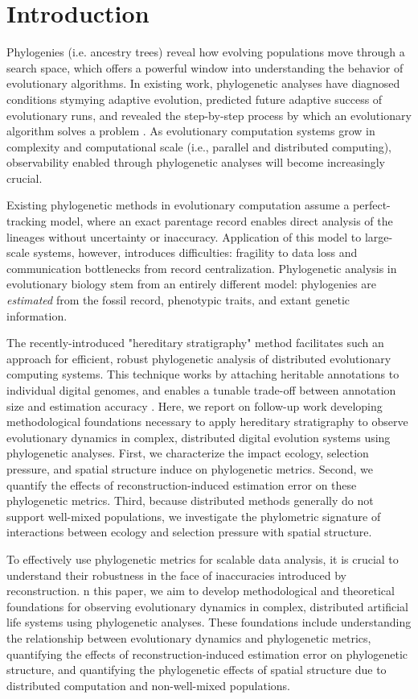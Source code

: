 \section{Introduction}

Phylogenies (i.e. ancestry trees) reveal how evolving populations move through a search space, which offers a powerful window into understanding the behavior of evolutionary algorithms.
In existing work, phylogenetic analyses have diagnosed conditions stymying adaptive evolution, predicted future adaptive success of evolutionary runs, and revealed the step-by-step process by which an evolutionary algorithm solves a problem \citep{hernandezWhatCanPhylogenetic2022a,shahbandeganUntanglingPhylogeneticDiversity2022a,lalejiniEvolutionaryOriginsPhenotypic2016}.
As evolutionary computation systems grow in complexity and computational scale  (i.e., parallel and distributed computing), observability enabled through phylogenetic analyses will become increasingly crucial.

Existing phylogenetic methods in evolutionary computation assume a perfect-tracking model, where an exact parentage record enables direct analysis of the lineages without uncertainty or inaccuracy.
Application of this model to large-scale systems, however, introduces difficulties: fragility to data loss and communication bottlenecks from record centralization.
Phylogenetic analysis in evolutionary biology stem from an entirely different model: phylogenies are \textit{estimated} from the fossil record, phenotypic traits, and extant genetic information.

The recently-introduced "hereditary stratigraphy" method facilitates such an approach for efficient, robust phylogenetic analysis of distributed evolutionary computing systems.
This technique works by attaching heritable annotations to individual digital genomes, and enables a tunable trade-off between annotation size and estimation accuracy \citep{moreno2022hstrat}.
Here, we report on follow-up work developing methodological foundations necessary to apply hereditary stratigraphy to observe evolutionary dynamics in complex, distributed digital evolution systems using phylogenetic analyses.
First, we characterize the impact ecology, selection pressure, and spatial structure induce on phylogenetic metrics.
Second, we quantify the effects of reconstruction-induced estimation error on these phylogenetic metrics.
Third, because distributed methods generally do not support well-mixed populations, we investigate the phylometric signature of interactions between  ecology and selection pressure with spatial structure.

To effectively use phylogenetic metrics for scalable data analysis, it is crucial to understand their robustness in the face of inaccuracies introduced by reconstruction.
n this paper, we aim to develop methodological and theoretical foundations for observing evolutionary dynamics in complex, distributed artificial life systems using phylogenetic analyses. These foundations include understanding the relationship between evolutionary dynamics and phylogenetic metrics, quantifying the effects of reconstruction-induced estimation error on phylogenetic structure, and quantifying the phylogenetic effects of spatial structure due to distributed computation and non-well-mixed populations.
